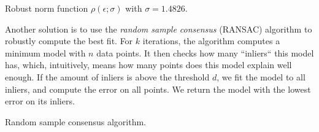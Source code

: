 \begin{marginfigure}

    \caption{Robust norm function $\rho(\epsilon;\sigma)$ with $\sigma=1.4826$.}
    \label{fig:robust-norm}
\end{marginfigure}

Another solution is to use the \textit{random sample consensus} (RANSAC)
algorithm to robustly compute the best fit. For $k$ iterations, the algorithm
computes a minimum model with $n$ data points. It then checks how many
``inliers`` this model has, which, intuitively, means how many points does this
model explain well enough. If the amount of inliers is above the threshold $d$,
we fit the model to all inliers, and compute the error on all points. We return
the model with the lowest error on its inliers.

\begin{algorithm}
    \begin{algorithmic}
        \State {$\epsilon_{\min} \gets \infty$}

         
        \EndIf
        \EndFor

        \If {$\epsilon < \epsilon_{\min}$}
        \EndIf
        \EndIf
        \End
        \EndFunction
    \end{algorithmic}
    \caption{Random sample consensus algorithm.}
\end{algorithm}


